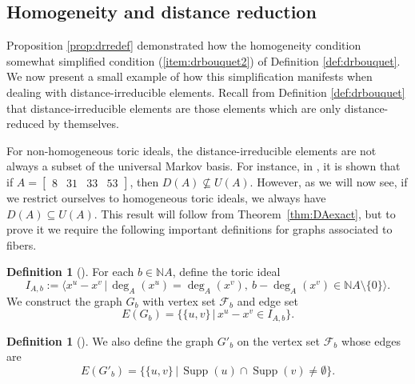 \documentclass[a4paper, 12pt]{article}
\newcommand{\NN}{\mathbb N}
\theoremstyle{plain}
\theoremstyle{definition}
\newtheorem{definition}[theorem]{Definition}
\theoremstyle{remark}
\begin{document}
\subsection{Homogeneity and distance reduction}



Proposition \ref{prop:drredef} demonstrated how the homogeneity condition somewhat simplified condition (\ref{item:drbouquet2}) of Definition \ref{def:drbouquet}. We now present a small example of how this simplification manifests when dealing with distance-irreducible elements. Recall from Definition \ref{def:drbouquet} that distance-irreducible elements are those elements which are only distance-reduced by themselves.

For non-homogeneous toric ideals, the distance-irreducible elements are not always a subset of the universal Markov basis. For instance, in \cite{CK_2024}, it is shown that if $A=\begin{bmatrix} 8&31&33&53\end{bmatrix}$, then  $D(A) \not\subseteq U(A)$. However, as we will now see, if we restrict ourselves to homogeneous toric ideals, we always have $D(A) \subseteq U(A)$. This result will follow from Theorem~\ref{thm:DAexact}, but to prove it we require the following important definitions for graphs associated to fibers. 

\begin{definition}[{\cite[Definition~2.1]{CKT_2007}}] \label{def:fiberGraph}
    For each $b \in \NN A$, define the toric ideal
$$I_{A,b} := \langle x^u-x^v \,|\,  \deg_A(x^u)=\deg_A(x^v), \  b - \deg_A(x^v) \in \NN A \setminus \{0\} \rangle.$$
We construct the graph $G_b$ with vertex set $\mathcal F_b$ and edge set 
$$E(G_b) = \{\{u,v\} \,|\, x^u-x^v \in I_{A,b}\}.$$
\end{definition}

\begin{definition}[{\cite[Section~2.1]{CM_2025}}] \label{def:3difgra}
    We also define the graph $G'_b$ on the vertex set $\mathcal{F}_b$ whose edges are  $$E(G'_b)=\{\{u,v\} \,|\, \operatorname{Supp}(u) \cap \operatorname{Supp}(v) \neq \emptyset\}.$$
\end{definition}
\end{document}
